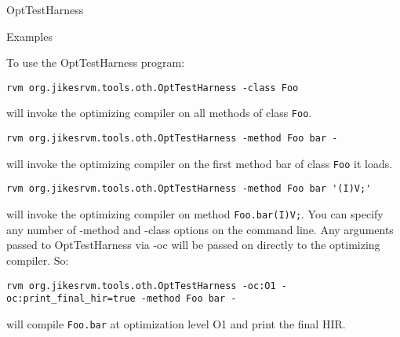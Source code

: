 \begin{section}{OptTestHarness}
\begin{subsection}{Examples}


To use the OptTestHarness program:

\begin{lstlisting}
rvm org.jikesrvm.tools.oth.OptTestHarness -class Foo
\end{lstlisting}

will invoke the optimizing compiler on all methods of class \verb#Foo#.

\begin{lstlisting}
rvm org.jikesrvm.tools.oth.OptTestHarness -method Foo bar -
\end{lstlisting}

will invoke the optimizing compiler on the first method bar of class \verb#Foo# it loads.

\begin{lstlisting}
rvm org.jikesrvm.tools.oth.OptTestHarness -method Foo bar '(I)V;'
\end{lstlisting}

will invoke the optimizing compiler on method \verb#Foo.bar(I)V;#.
You can specify any number of -method and -class options on the command line. Any arguments passed to OptTestHarness via -oc will be passed on directly to the optimizing compiler. So:

\begin{lstlisting}
rvm org.jikesrvm.tools.oth.OptTestHarness -oc:O1 -oc:print_final_hir=true -method Foo bar -
\end{lstlisting}

will compile \verb#Foo.bar# at optimization level O1 and print the final HIR.

\end{subsection}

\end{section}